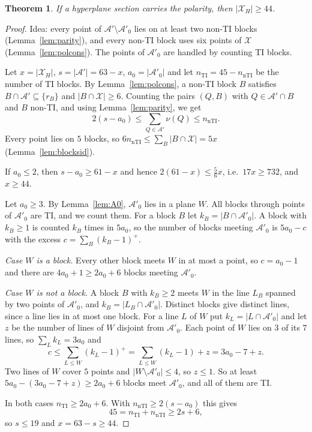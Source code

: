 \documentclass[11pt]{amsart}
\newtheorem{theorem}{Theorem}[section]
\theoremstyle{definition}
\newcommand{\X}{\mathcal{X}}
\newcommand{\A}{\mathcal{A}}
\newcommand{\nnti}{n_{\mathrm{nTI}}}
\begin{document}
\begin{theorem}\label{thm:pol44}
If a hyperplane section carries the polarity, then $|\X_H|\ge44$.
\end{theorem}
\begin{proof}
Idea: every point of $\A'\setminus\A'_0$ lies on at least two non-TI blocks (Lemma~\ref{lem:parity}), and every non-TI block uses six points of $\X$ (Lemma~\ref{lem:polcons}). The points of $\A'_0$ are handled by counting TI blocks.

Let $x=|\X_H|$, $s=|\A'|=63-x$, $a_0=|\A'_0|$ and let $n_{\mathrm{TI}}=45-\nnti$ be the number of TI blocks. By Lemma~\ref{lem:polcons}, a non-TI block $B$ satisfies $B\cap\A'\subseteq\{r_B\}$ and $|B\cap\X|\ge6$. Counting the pairs $(Q,B)$ with $Q\in\A'\cap B$ and $B$ non-TI, and using Lemma~\ref{lem:parity}, we get
\[
2(s-a_0)\le\sum_{Q\in\A'}\nu(Q)\le\nnti .
\]
Every point lies on $5$ blocks, so $6\nnti\le\sum_B|B\cap\X|=5x$ (Lemma~\ref{lem:blocksid}).

If $a_0\le2$, then $s-a_0\ge61-x$ and hence $2(61-x)\le\frac56x$, i.e.\ $17x\ge732$, and $x\ge44$.

Let $a_0\ge3$. By Lemma~\ref{lem:A0}, $\A'_0$ lies in a plane $W$. All blocks through points of $\A'_0$ are TI, and we count them. For a block $B$ let $k_B=|B\cap\A'_0|$. A block with $k_B\ge1$ is counted $k_B$ times in $5a_0$, so the number of blocks meeting $\A'_0$ is $5a_0-c$ with the excess $c=\sum_B(k_B-1)^+$.

\emph{Case $W$ is a block.} Every other block meets $W$ in at most a point, so $c=a_0-1$ and there are $4a_0+1\ge2a_0+6$ blocks meeting $\A'_0$.

\emph{Case $W$ is not a block.} A block $B$ with $k_B\ge2$ meets $W$ in the line $L_B$ spanned by two points of $\A'_0$, and $k_B=|L_B\cap\A'_0|$. Distinct blocks give distinct lines, since a line lies in at most one block. For a line $L$ of $W$ put $k_L=|L\cap\A'_0|$ and let $z$ be the number of lines of $W$ disjoint from $\A'_0$. Each point of $W$ lies on $3$ of its $7$ lines, so $\sum_Lk_L=3a_0$ and
\[
c\le\sum_{L\le W}(k_L-1)^+=\sum_{L\le W}(k_L-1)+z=3a_0-7+z .
\]
Two lines of $W$ cover $5$ points and $|W\setminus\A'_0|\le4$, so $z\le1$. So at least $5a_0-(3a_0-7+z)\ge2a_0+6$ blocks meet $\A'_0$, and all of them are TI.

In both cases $n_{\mathrm{TI}}\ge2a_0+6$. With $\nnti\ge2(s-a_0)$ this gives
\[
45=n_{\mathrm{TI}}+\nnti\ge2s+6,
\]
so $s\le19$ and $x=63-s\ge44$.
\end{proof}
\end{document}
